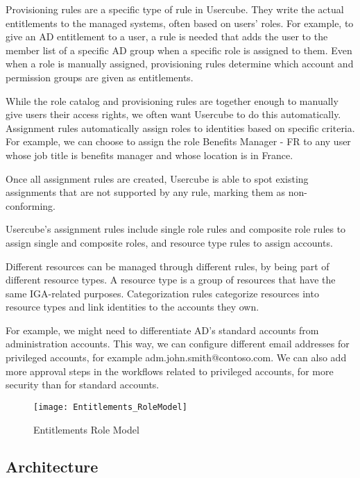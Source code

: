 Provisioning rules are a specific type of rule in Usercube. They write the actual entitlements to the managed systems, often based on users’ roles. For example, to give an AD entitlement to a user, a rule is needed that adds the user to the member list of a specific AD group when a specific role is assigned to them. Even when a role is manually assigned, provisioning rules determine which account and permission groups are given as entitlements.

While the role catalog and provisioning rules are together enough to manually give users their access rights, we often want Usercube to do this automatically. Assignment rules automatically assign roles to identities based on specific criteria. For example, we can choose to assign the role Benefits Manager - FR to any user whose job title is benefits manager and whose location is in France.

Once all assignment rules are created, Usercube is able to spot existing assignments that are not supported by any rule, marking them as non-conforming.

Usercube’s assignment rules include single role rules and composite role rules to assign single and composite roles, and resource type rules to assign accounts.

Different resources can be managed through different rules, by being part of different resource types. A resource type is a group of resources that have the same IGA-related purposes. Categorization rules categorize resources into resource types and link identities to the accounts they own.

For example, we might need to differentiate AD’s standard accounts from administration accounts. This way, we can configure different email addresses for privileged accounts, for example adm.john.smith@contoso.com. We can also add more approval steps in the workflows related to privileged accounts, for more security than for standard accounts.

\begin{figure}[htbp]
  \centering
  \texttt{[image: Entitlements\_RoleModel]}
  \caption{Entitlements Role Model}
  \label{fig:configurationCycle}
\end{figure}



\subsection{Architecture}
\label{sec:Template}

